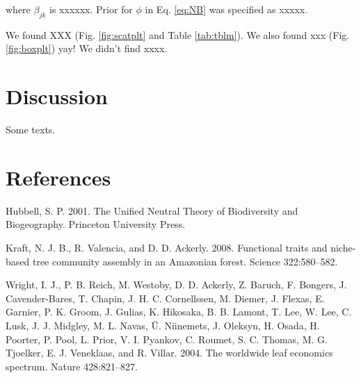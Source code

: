 \documentclass[12pt,]{article}
\begin{document}
where \(\beta_{jk}\) is xxxxxx. Prior for \(\phi\) in Eq. \eqref{eq:NB} was specified as xxxxx.

We found XXX (Fig. \ref{fig:scatplt} and Table \ref{tab:tblm}). We also found xxx (Fig. \ref{fig:boxplt}) yay! We didn't find xxxx.

\hypertarget{discussion}{%
\section{Discussion}\label{discussion}}

Some texts.

\hypertarget{references}{%
\section{References}\label{references}}

\hypertarget{refs}{}
\leavevmode\hypertarget{ref-Hubbell2001}{}%
Hubbell, S. P. 2001. The Unified Neutral Theory of Biodiversity and Biogeography. Princeton University Press.

\leavevmode\hypertarget{ref-Kraft2008}{}%
Kraft, N. J. B., R. Valencia, and D. D. Ackerly. 2008. Functional traits and niche-based tree community assembly in an Amazonian forest. Science 322:580--582.

\leavevmode\hypertarget{ref-Wright2004a}{}%
Wright, I. J., P. B. Reich, M. Westoby, D. D. Ackerly, Z. Baruch, F. Bongers, J. Cavender-Bares, T. Chapin, J. H. C. Cornellssen, M. Diemer, J. Flexas, E. Garnier, P. K. Groom, J. Gulias, K. Hikosaka, B. B. Lamont, T. Lee, W. Lee, C. Lusk, J. J. Midgley, M. L. Navas, Ü. Niinemets, J. Oleksyn, H. Osada, H. Poorter, P. Pool, L. Prior, V. I. Pyankov, C. Roumet, S. C. Thomas, M. G. Tjoelker, E. J. Veneklaas, and R. Villar. 2004. The worldwide leaf economics spectrum. Nature 428:821--827.

\newpage

\hypertarget{section}{%
\section{}\label{section}}
\end{document}
